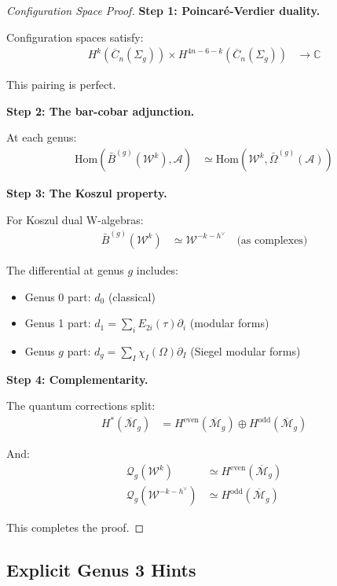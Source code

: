 \begin{proof}[Configuration Space Proof]
\textbf{Step 1: Poincaré-Verdier duality.}

Configuration spaces satisfy:
\begin{align}
H^k(\overline{C}_n(\Sigma_g)) \times H^{4n-6-k}(\overline{C}_n(\Sigma_g)) &\to \mathbb{C}
\end{align}

This pairing is perfect.

\textbf{Step 2: The bar-cobar adjunction.}

At each genus:
\begin{align}
\text{Hom}(\bar{B}^{(g)}(\mathcal{W}^k), \mathcal{A}) &\simeq \text{Hom}(\mathcal{W}^k, \bar{\Omega}^{(g)}(\mathcal{A}))
\end{align}

\textbf{Step 3: The Koszul property.}

For Koszul dual W-algebras:
\begin{align}
\bar{B}^{(g)}(\mathcal{W}^k) &\simeq \mathcal{W}^{-k-h^\vee} \quad \text{(as complexes)}
\end{align}

The differential at genus $g$ includes:
\begin{itemize}
\item Genus 0 part: $d_0$ (classical)
\item Genus 1 part: $d_1 = \sum_i E_{2i}(\tau) \partial_i$ (modular forms)
\item Genus $g$ part: $d_g = \sum_I \chi_I(\Omega) \partial_I$ (Siegel modular forms)
\end{itemize}

\textbf{Step 4: Complementarity.}

The quantum corrections split:
\begin{align}
H^*(\overline{\mathcal{M}}_g) &= H^{\text{even}}(\overline{\mathcal{M}}_g) \oplus H^{\text{odd}}(\overline{\mathcal{M}}_g)
\end{align}

And:
\begin{align}
\mathcal{Q}_g(\mathcal{W}^k) &\simeq H^{\text{even}}(\overline{\mathcal{M}}_g) \\
\mathcal{Q}_g(\mathcal{W}^{-k-h^\vee}) &\simeq H^{\text{odd}}(\overline{\mathcal{M}}_g)
\end{align}

This completes the proof.
\end{proof}

\subsection{Explicit Genus 3 Hints}

